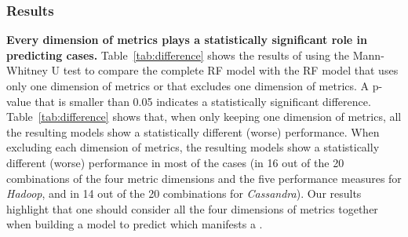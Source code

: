 \subsubsection*{Results}

\textbf{Every dimension of metrics plays a statistically significant role in predicting \inconsistent cases.}
Table~\ref{tab:difference} shows the results of using the Mann-Whitney U test to compare the complete RF model with the RF model that uses only one dimension of metrics or that excludes one dimension of metrics. A p-value that is smaller than 0.05 indicates a statistically significant difference.
Table~\ref{tab:difference} shows that, when only keeping one dimension of metrics, all the resulting models show a statistically different (worse) performance.
When excluding each dimension of metrics, the resulting models show a statistically different (worse) performance in most of the cases (in 16 out of the 20 combinations of the four metric dimensions and the five performance measures for \emph{Hadoop}, and in 14 out of the 20 combinations for \emph{Cassandra}).
Our results highlight that one should consider all the four dimensions of metrics together when building a model to predict which \instance manifests a \inconsistent.

